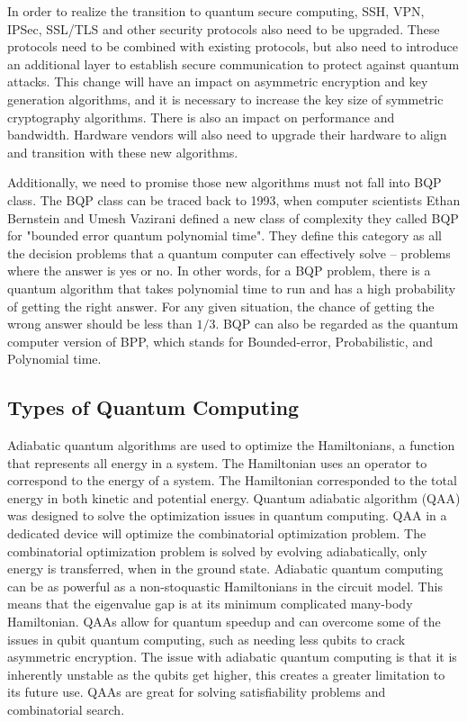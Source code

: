 \documentclass[sigconf]{acmart}
\begin{document}
In order to realize the transition to quantum secure computing, SSH, VPN, IPSec, SSL/TLS and other security protocols also need to be upgraded. These protocols need to be combined with existing protocols, but also need to introduce an additional layer to establish secure communication to protect against quantum attacks. This change will have an impact on asymmetric encryption and key generation algorithms, and it is necessary to increase the key size of symmetric cryptography algorithms. There is also an impact on performance and bandwidth. Hardware vendors will also need to upgrade their hardware to align and transition with these new algorithms.

Additionally, we need to promise those new algorithms must not fall into BQP class. The BQP class can be traced back to 1993, when computer scientists Ethan Bernstein and Umesh Vazirani defined a new class of complexity they called BQP for "bounded error quantum polynomial time"\cite{bernstein_quantum_1997}. They define this category as all the decision problems that a quantum computer can effectively solve -- problems where the answer is yes or no. In other words, for a BQP problem, there is a quantum algorithm that takes polynomial time to run and has a high probability of getting the right answer. For any given situation, the chance of getting the wrong answer should be less than $1/3$. BQP can also be regarded as the quantum computer version of BPP, which stands for Bounded-error, Probabilistic, and Polynomial time\cite{younes_bounded-error_2015}. 

\subsection{Types of Quantum Computing}
Adiabatic quantum algorithms are used to optimize the Hamiltonians, a function that represents all energy in a system. The Hamiltonian uses an operator to correspond to the energy of a system. The Hamiltonian corresponded to the total energy in both kinetic and potential energy. Quantum adiabatic algorithm (QAA) was designed to solve the optimization issues in quantum computing. QAA in a dedicated device will optimize the combinatorial optimization problem. The combinatorial optimization problem is solved by evolving adiabatically, only energy is transferred, when in the ground state. Adiabatic quantum computing can be as powerful as a non-stoquastic Hamiltonians in the circuit model. This means that the eigenvalue gap is at its minimum complicated many-body Hamiltonian. QAAs allow for quantum speedup and can overcome some of the issues in qubit quantum computing, such as needing less qubits to crack asymmetric encryption. The issue with adiabatic quantum computing is that it is inherently unstable as the qubits get higher, this creates a greater limitation to its future use. QAAs are great for solving satisfiability problems and combinatorial search\cite{albash_adiabatic_2016}.
\end{document}
